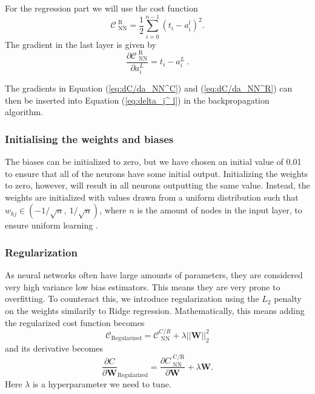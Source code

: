 \documentclass[a4paper, 11pt, twocolumn]{article}
\begin{document}
For the regression part we will use the cost function
\begin{equation}
\mathcal{C}_\text{ NN}^\text{ R} = \frac{1}{2}\sum_{i=0}^{n-1}(t_i-a_i^l)^2.
\end{equation}
The gradient in the last layer is given by
\begin{equation}
	\frac{\partial \mathcal{C}_\text{ NN}^\text{ R}}{\partial a_i^L}=t_i -a_i^L\ .
	\label{eq:dC/da_NN^R}
\end{equation}

The gradients in Equation (\ref{eq:dC/da_NN^C}) and (\ref{eq:dC/da_NN^R}) can then be inserted into Equation (\ref{eq:delta_j^ l}) in the backpropagation algorithm.
\subsubsection{Initialising  the weights and biases}
The biases can be initialized to zero, but we have chosen an initial value of 0.01
to ensure that all of the neurons have some initial output. Initializing the
weights to zero, however, will result in all neurons outputting the same value.
Instead, the  weights are initialized with values drawn from a uniform distribution
such that $w_{kj}\in (-1/\sqrt{n}, \ 1/\sqrt{n})$, where $n$ is the amount of
nodes in the input layer,  to ensure uniform learning \cite{ML_algo}.

\subsubsection{Regularization}
As neural networks often have large amounts of parameters, they are considered
very high variance low bias estimators. This means they are very prone to
overfitting. To counteract this, we introduce regularization using the $L_2$
penalty on the weights similarily to Ridge regression. Mathematically, this means
adding the regularized cost function becomes
\begin{equation}
  \mathcal{C}_{\text{Regularized}} = \mathcal{C}_\text{ NN}^{C/R} + \lambda ||\bm{W}||_2^2
  \label{Regularized cost}
\end{equation}
and its derivative becomes
\begin{equation}
  \frac{ \partial C}  {\partial \bm{W}}_\text{Regularized}
  = \frac{ \partial C_\text{ NN}^\text{ C/R}}  {\partial \bm{W}} + \lambda \bm{W}.
\end{equation}
Here $\lambda$ is a hyperparameter we need to tune.
\end{document}
